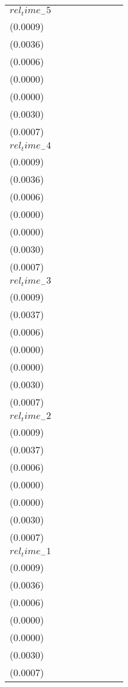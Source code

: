 \begin{tabular}{llllllll}
$rel_time_-5$ & \makecell{$-0.0010^{}$ \\ ($0.0009$)} & \makecell{$-0.0033^{}$ \\ ($0.0036$)} & \makecell{$-0.0006^{}$ \\ ($0.0006$)} & \makecell{$-0.0001^{**}$ \\ ($0.0000$)} & \makecell{$-0.0000^{}$ \\ ($0.0000$)} & \makecell{$-0.0040^{}$ \\ ($0.0030$)} & \makecell{$-0.0011^{}$ \\ ($0.0007$)} \\
$rel_time_-4$ & \makecell{$-0.0026^{***}$ \\ ($0.0009$)} & \makecell{$-0.0091^{**}$ \\ ($0.0036$)} & \makecell{$-0.0017^{***}$ \\ ($0.0006$)} & \makecell{$-0.0002^{***}$ \\ ($0.0000$)} & \makecell{$-0.0001^{***}$ \\ ($0.0000$)} & \makecell{$-0.0089^{***}$ \\ ($0.0030$)} & \makecell{$-0.0023^{***}$ \\ ($0.0007$)} \\
$rel_time_-3$ & \makecell{$-0.0006^{}$ \\ ($0.0009$)} & \makecell{$-0.0024^{}$ \\ ($0.0037$)} & \makecell{$-0.0040^{***}$ \\ ($0.0006$)} & \makecell{$-0.0003^{***}$ \\ ($0.0000$)} & \makecell{$-0.0001^{***}$ \\ ($0.0000$)} & \makecell{$-0.0041^{}$ \\ ($0.0030$)} & \makecell{$-0.0011^{}$ \\ ($0.0007$)} \\
$rel_time_-2$ & \makecell{$-0.0004^{}$ \\ ($0.0009$)} & \makecell{$-0.0020^{}$ \\ ($0.0037$)} & \makecell{$-0.0036^{***}$ \\ ($0.0006$)} & \makecell{$-0.0003^{***}$ \\ ($0.0000$)} & \makecell{$-0.0001^{***}$ \\ ($0.0000$)} & \makecell{$-0.0034^{}$ \\ ($0.0030$)} & \makecell{$-0.0010^{}$ \\ ($0.0007$)} \\
$rel_time_-1$ & \makecell{$0.0011^{}$ \\ ($0.0009$)} & \makecell{$0.0051^{}$ \\ ($0.0036$)} & \makecell{$-0.0009^{}$ \\ ($0.0006$)} & \makecell{$-0.0000^{}$ \\ ($0.0000$)} & \makecell{$-0.0000^{**}$ \\ ($0.0000$)} & \makecell{$0.0034^{}$ \\ ($0.0030$)} & \makecell{$0.0006^{}$ \\ ($0.0007$)} \\

\end{tabular}
